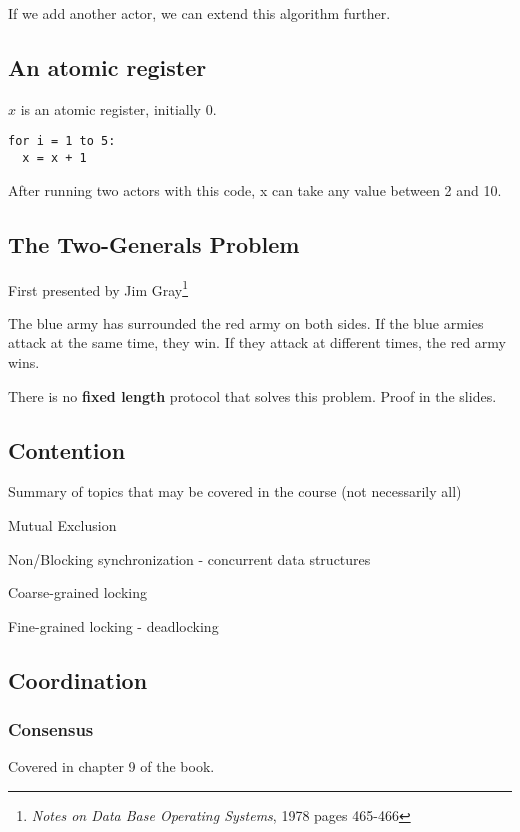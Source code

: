 \documentclass[a4paper]{article}
\newenvironment{itemize*}%
  {\begin{itemize}%
    \setlength{\itemsep}{0pt}%
    \setlength{\parsep}{0pt}%
    \setlength{\parskip}{0pt}}%
  {\end{itemize}}
\begin{document}
If we add another actor, we can extend this algorithm further.

\subsection{An atomic register}

$x$ is an atomic register, initially 0.

\begin{lstlisting}[frame=L]
for i = 1 to 5:
  x = x + 1
\end{lstlisting}

After running two actors with this code, x can take any value between 2 and 10.

\subsection{The Two-Generals Problem}

First presented by Jim Gray\footnote{\textit{Notes on Data Base Operating Systems}, 1978 pages 465-466}

The blue army has surrounded the red army on both sides.
If the blue armies attack at the same time, they win.
If they attack at different times, the red army wins.

There is no \textbf{fixed length} protocol that solves this problem.
Proof in the slides.

\subsection{Contention}

Summary of topics that may be covered in the course (not necessarily all)

\begin{itemize*}
  \item Mutual Exclusion
  \item Non/Blocking synchronization - concurrent data structures
  \item Coarse-grained locking
  \item Fine-grained locking - deadlocking
\end{itemize*}

\subsection{Coordination}

\subsubsection{Consensus}
Covered in chapter 9 of the book.
\end{document}
